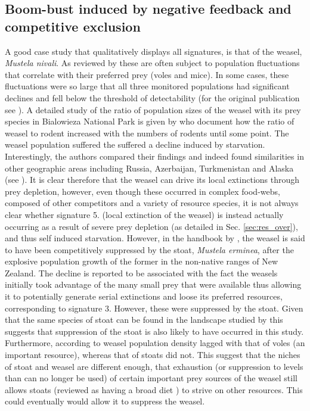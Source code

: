 \documentclass[a4paper]{report}
\begin{document}
\subsection{Boom-bust induced by negative feedback and competitive exclusion \label{sec:stoat}}

A good case study that qualitatively displays all signatures, is that of the weasel,\textit{ Mustela nivali}. As reviewed by \citep{Simberloff2004} these are often subject to population fluctuations that correlate with their preferred prey (voles and mice). In some cases, these fluctuations were so large that all three monitored populations had significant declines and fell below the threshold of detectability (for the original publication see \citep{Korpim1991}). A detailed study of the ratio of population sizes of the weasel with its prey species in Bialowieza National Park is given by \citep{Society1995} who document how the ratio of weasel to rodent increased with the numbers of rodents until some point. The weasel population suffered the suffered a decline induced by starvation. Interestingly, the authors compared their findings and indeed found similarities in other geographic areas including Russia, Azerbaijan, Turkmenistan and Alaska (see \citep{Jr2018}). It is clear therefore that the weasel can drive its local extinctions through prey depletion, however, even though these occurred in complex food-webs, composed of other competitors and a variety of resource species, it is not always clear whether signature 5. (local extinction of the weasel) is instead actually occurring as a result of severe prey depletion (as detailed in Sec. \ref{sec:res_over}), and thus self induced starvation. However, in the handbook by \citep{KingC}, the weasel is said to have been competitively suppressed by the stoat, \textit{Mustela erminea}, after the explosive population growth of the former in the non-native ranges of New Zealand. The decline is reported to be associated with the fact the weasels initially took advantage of the many small prey that were available thus allowing it to potentially generate serial extinctions and loose its preferred resources, corresponding to signature 3. However, these were suppressed by the stoat. Given that the same species of stoat can be found in the landscape studied by \citep{Society1995} this suggests that suppression of the stoat is also likely to have occurred in this study. Furthermore, according to \citep{Korpim1991} weasel population density lagged with that of voles (an important resource), whereas that of stoats did not. This suggest that the niches of stoat and weasel are different enough, that exhaustion (or suppression to levels than can no longer be used) of certain important prey sources of the weasel still allows stoats (reviewed as having a broad diet \citep{Simberloff2004}) to strive on other resources. This could eventually would allow it to suppress the weasel.\\
\end{document}
